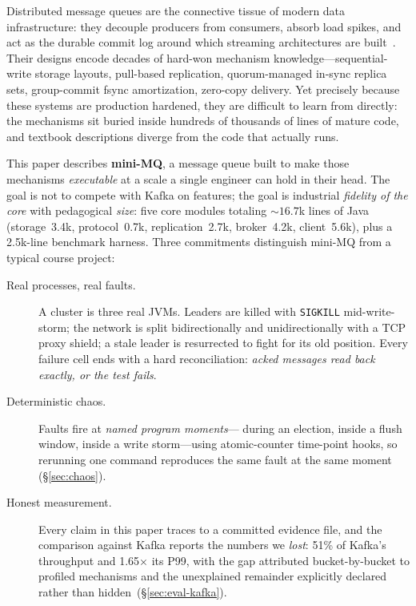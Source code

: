 \documentclass[letterpaper,twocolumn,10pt]{article}
\begin{document}
Distributed message queues are the connective tissue of modern data
infrastructure: they decouple producers from consumers, absorb load spikes,
and act as the durable commit log around which streaming architectures are
built~\cite{kreps13log,kleppmann17ddia}. Their designs encode decades of
hard-won mechanism knowledge---sequential-write storage layouts,
pull-based replication, quorum-managed in-sync replica sets, group-commit
fsync amortization, zero-copy delivery. Yet precisely because these systems
are production hardened, they are difficult to learn from directly: the
mechanisms sit buried inside hundreds of thousands of lines of mature code,
and textbook descriptions diverge from the code that actually runs.

This paper describes \textbf{mini-MQ}, a message queue built to make those
mechanisms \emph{executable} at a scale a single engineer can hold in their
head. The goal is not to compete with Kafka on features; the goal is
industrial \emph{fidelity of the core} with pedagogical \emph{size}: five
core modules totaling ${\sim}16.7$k lines of Java
(storage~3.4k, protocol~0.7k, replication~2.7k, broker~4.2k,
client~5.6k), plus a 2.5k-line benchmark harness. Three commitments
distinguish mini-MQ from a typical course project:

\begin{description}
\item[Real processes, real faults.] A cluster is three real JVMs. Leaders
  are killed with \texttt{SIGKILL} mid-write-storm; the network is split
  bidirectionally and unidirectionally with a TCP proxy shield; a stale
  leader is resurrected to fight for its old position. Every failure cell
  ends with a hard reconciliation: \emph{acked messages read back exactly,
  or the test fails}.
\item[Deterministic chaos.] Faults fire at \emph{named program moments}---
  during an election, inside a flush window, inside a write storm---using
  atomic-counter time-point hooks, so rerunning one command reproduces the
  same fault at the same moment (\S\ref{sec:chaos}).
\item[Honest measurement.] Every claim in this paper traces to a committed
  evidence file, and the comparison against Kafka reports the numbers we
  \emph{lost}: 51\% of Kafka's throughput and 1.65$\times$ its P99, with the
  gap attributed bucket-by-bucket to profiled mechanisms and the
  unexplained remainder explicitly declared rather than
  hidden~(\S\ref{sec:eval-kafka}).
\end{description}
\end{document}
